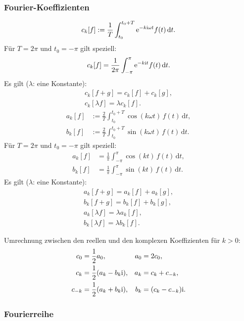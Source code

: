 \subsubsection{Fourier-Koeffizienten}
\begin{equation}
c_k[f] := \frac{1}{T}\int_{t_0}^{t_0+T} \mathrm e^{-k\mathrm i\omega t}f(t)\,\mathrm dt.
\end{equation}
Für $T=2\pi$ und $t_0=-\pi$ gilt speziell:
\begin{equation}
c_k[f] = \frac{1}{2\pi}\int_{-\pi}^{\pi} \mathrm e^{-k\mathrm i t}f(t)\,\mathrm dt.
\end{equation}
Es gilt ($\lambda$: eine Konstante):
\begin{gather}
c_k[f+g] = c_k[f]+c_k[g],\\
c_k[\lambda f] = \lambda c_k[f].
\end{gather}
\begin{align}
a_k[f] &:= \frac{2}{T}\int_{t_0}^{t_0+T} \cos(k\omega t)\,f(t)\,\mathrm dt,\\
b_k[f] &:= \frac{2}{T}\int_{t_0}^{t_0+T} \sin(k\omega t)\,f(t)\,\mathrm dt.
\end{align}
Für $T=2\pi$ und $t_0=-\pi$ gilt speziell:
\begin{align}
a_k[f] &= \frac{1}{\pi}\int_{-\pi}^{\pi} \cos(kt)\,f(t)\,\mathrm dt,\\
b_k[f] &= \frac{1}{\pi}\int_{-\pi}^{\pi} \sin(kt)\,f(t)\,\mathrm dt.
\end{align}
Es gilt ($\lambda$: eine Konstante):
\begin{gather}
a_k[f+g] = a_k[f]+a_k[g],\\
b_k[f+g] = b_k[f]+b_k[g],\\
a_k[\lambda f] = \lambda a_k[f],\\
b_k[\lambda f] = \lambda b_k[f].
\end{gather}

\noindent
Umrechnung zwischen den reellen und den komplexen
Koeffizienten für $k>0$:
\begin{align}
c_0 &= \frac{1}{2}a_0, & a_0&=2c_0,\\
c_k &= \frac{1}{2}(a_k-b_k\mathrm i), & a_k &= c_k+c_{-k},\\
c_{-k} &= \frac{1}{2}(a_k+b_k\mathrm i), & b_k &= (c_k-c_{-k})\mathrm i.
\end{align}

\subsubsection{Fourierreihe}


